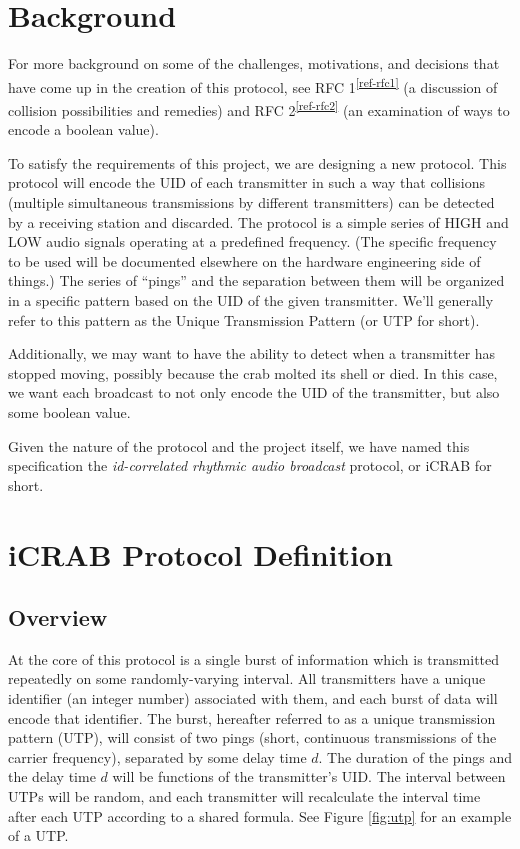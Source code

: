 \documentclass[12pt,hidelinks]{article}
\newcommand{\fastcite}[1]{\textsuperscript{\ref{#1}}}
\begin{document}
\section{Background} \label{background}

For more background on some of the challenges, motivations, and decisions
that have come up in the creation of this protocol, see
RFC 1\fastcite{ref-rfc1}
(a discussion of collision possibilities and remedies) and
RFC 2\fastcite{ref-rfc2} (an examination of ways to encode a boolean value).

To satisfy the requirements of this project, we are designing a new protocol.
This protocol will encode the UID of each transmitter in such a way that
collisions (multiple simultaneous transmissions by different transmitters) can
be detected by a receiving station and discarded.
The protocol is a simple
series of HIGH and LOW audio signals operating at a predefined
frequency. (The specific frequency to be used will be documented elsewhere
on the hardware engineering side of things.)
The series of ``pings'' and the separation between them will be organized in a
specific pattern based on the UID of the given transmitter.
We'll generally refer to this pattern as the
Unique Transmission Pattern (or UTP for short).

Additionally, we may want to have the ability to detect when a transmitter
has stopped moving, possibly because the crab molted its shell or died.
In this case, we want each broadcast to not only encode the UID of the
transmitter, but also some boolean value.

Given the nature of the protocol and the project itself, we have named
this specification
the {\em id-correlated rhythmic audio broadcast} protocol,
or iCRAB for short.

\section{iCRAB Protocol Definition} \label{protocol-def}

\subsection{Overview}

At the core of this protocol is a single burst of information which is
transmitted repeatedly on some randomly-varying interval.
All transmitters have a unique identifier (an integer number) associated with
them, and each burst of data will encode that identifier.
The burst, hereafter referred to as a
unique transmission pattern (UTP), will consist of two pings (short, continuous
transmissions of the carrier frequency), separated by some delay time $d$.
The duration of the pings and the delay time $d$ will be functions of the
transmitter's UID.
The interval between UTPs will be random, and each transmitter will recalculate
the interval time after each UTP according to a shared formula.
See Figure \ref{fig:utp} for an example of a UTP.
\end{document}
